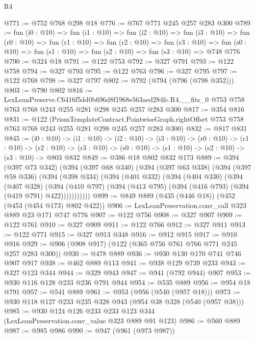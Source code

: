 \begin{lexlean}{R4}
\begin{coremodule}
@771 := @752 @768 @298 @18
@776 := @767 @771 @245 @257 @283 @300
@789 := fun (i0 : @10) =>
  fun (i1 : @10) =>
  fun (i2 : @10) =>
  fun (i3 : @10) =>
  fun (r0 : @10) =>
  fun (r1 : @10) =>
  fun (r2 : @10) =>
  fun (r3 : @10) =>
  fun (s0 : @10) => fun (s1 : @10) => fun (s2 : @10) => fun (s3 : @10) => @748 @776
@790 := @324 @18
@791 := @122 @753
@792 := @327 @791
@793 := @122 @758
@794 := @327 @793
@795 := @122 @763
@796 := @327 @795
@797 := @122 @768
@798 := @327 @797
@802 := @792 (@794 (@796 (@798 @352)))
@803 := @790 @802
@816 := LexLeanPreserve.C6416f5dd0b696d8f1968e563aed284fc.R4.__fits_0
    @753
    @758
    @763
    @768
    @243
    @255
    @281
    @298
    @245
    @257
    @283
    @300
@817 := @354 @816
@831 := @122
    (PrismTemplateContract.PointwiseGraph.rightOffset
      @753
      @758
      @763
      @768
      @243
      @255
      @281
      @298
      @245
      @257
      @283
      @300)
@832 := @817 @831
@845 := (i0 : @10) ->
  (i1 : @10) ->
  (i2 : @10) ->
  (i3 : @10) ->
  (r0 : @10) ->
  (r1 : @10) ->
  (r2 : @10) -> (r3 : @10) -> (s0 : @10) -> (s1 : @10) -> (s2 : @10) -> (s3 : @10) -> @803 @832
@849 := @386 @18 @802 @832 @173
@889 := @394
    (@397 @73 @342)
    (@394
      (@397 @68 @340)
      (@394
        (@397 @63 @338)
        (@394
          (@397 @58 @336)
          (@394
            (@398 @334)
            (@394
              (@401 @332)
              (@394
                (@404 @330)
                (@394
                  (@407 @328)
                  (@394
                    (@410 @797)
                    (@394 (@413 @795) (@394 (@416 @793) (@394 (@419 @791) @422)))))))))))
@899 := @849 @889 (@435 (@446 @18)) (@452 (@453 (@454 @173) @802 @422))
@906 := LexLeanPreservation.conv_call @323 @889 @23 @171 @747 @776
@907 := @122 @756
@908 := @327 @907
@909 := @122 @761
@910 := @327 @909
@911 := @122 @766
@912 := @327 @911
@913 := @122 @771
@915 := @327 @913 @348
@916 := @912 @915
@917 := @910 @916
@929 := @906 (@908 @917) (@122 (@365 @756 @761 @766 @771 @245 @257 @283 @300))
@930 := @478 @889
@936 := @930 @130 @170 @741 @746 @907 @917
@938 := @462 @889 @113
@941 := @938 @129 @739 @233
@943 := @327 @123 @344
@944 := @329 @943
@947 := @941 (@792 @944) @907
@953 := @930 @116 @128 @233 @236 @791 @944
@954 := @535 @889
@956 := @954 @18 @791
@957 := @541 @889
@961 := @953 (@956 (@540 (@957 @18)))
@973 := @930 @118 @127 @233 @235 @328 @943 (@954 @38 @328 (@540 (@957 @38)))
@985 := @930 @124 @126 @233 @233 @123 @344 (LexLeanPreservation.conv_value @323 @889 @91 @123)
@986 := @560 @889
@987 := @985 @986
@990 := @947 (@961 (@973 @987))

\end{coremodule}
\end{lexlean}

